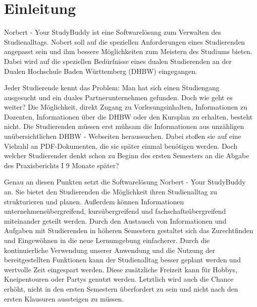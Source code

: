 
\chapter{Einleitung}
Norbert - Your StudyBuddy ist eine Softwarelösung zum Verwalten des Studienalltags. Nobert soll auf die speziellen Anforderungen eines Studierenden angepasst sein und ihm bessere Möglichkeiten zum Meistern des Studiums bieten. Dabei wird auf die speziellen Bedürfnisse eines dualen Studierenden an der Dualen Hochschule Baden Württemberg (DHBW) eingegangen.

Jeder Studierende kennt das Problem: Man hat sich einen Studiengang ausgesucht und ein duales Partnerunternehmen gefunden. Doch wie geht es weiter? Die Möglichkeit, direkt Zugang zu Vorlesungsinhalten, Informationen zu Dozenten, Informationen über die DHBW oder den Kursplan zu erhalten, besteht nicht. Die Studierenden müssen erst mühsam die Informationen aus unzähligen unübersichtlichen DHBW - Webseiten heraussuchen. Dabei stoßen sie auf eine Vielzahl an PDF-Dokumenten, die sie später einmal benötigen werden. Doch welcher Studierender denkt schon zu Beginn des ersten Semesters an die Abgabe des Praxisberichts I 9 Monate später?

Genau an diesen Punkten setzt die Softwarelösung Norbert - Your StudyBuddy an. Sie bietet den Studierenden die Möglichkeit ihren Studienalltag zu strukturieren und planen. Außerdem können Informationen unternehmensübergreifend, kursübergreifend und fachschaftsübergreifend miteinander geteilt werden. Durch den Austausch von Informationen und Aufgaben mit Studierenden in höheren Semestern gestaltet sich das Zurechtfinden und Eingewöhnen in die neue Lernumgebung einfacherer. Durch die kontinuierliche Verwendung unserer Anwendung und die Nutzung der bereitgestellten Funktionen kann der Studienalltag besser geplant werden und wertvolle Zeit eingespart werden. Diese zusätzliche Freizeit kann für Hobbys, Kneipentouren oder Partys genutzt werden. Letztlich wird auch die Chance erhöht, nicht in den ersten Semestern überfordert zu sein und nicht nach den ersten Klausuren aussteigen zu müssen. 
